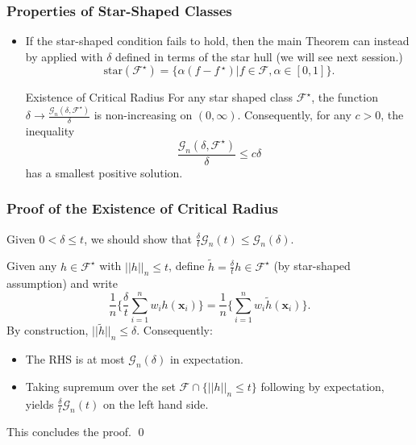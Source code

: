 \documentclass[11pt]{beamer}
\newcommand{\bx}{\mathbf{x}}
\newcommand{\cF}{\mathcal{F}}
\newcommand{\cG}{\mathcal{G}}
\newcommand{\fstar}{f\,^\star}
\begin{document}
	\begin{frame}
		\frametitle{Properties of Star-Shaped Classes}
		\begin{itemize}
			\item If the star-shaped condition fails to hold, then the main Theorem can instead by applied with $\delta$ defined in terms of the star hull (we will see next session.)
			\begin{equation*}
				\mathrm{star}(\cF^\star) = \big\{\alpha(f-\fstar) | f \in \cF, \alpha \in [0, 1]\big\}.
			\end{equation*}			
			
			\begin{block}{Existence of Critical Radius}
				For any star shaped class $\mathcal{F}^\star$, the function $\delta \rightarrow \frac{\cG_n(\delta, \cF^\star)}{\delta}$ is non-increasing on $(0, \infty)$. Consequently, for any $c>0$, the inequality 
				\begin{equation*}
			\frac{\cG_n(\delta, \cF^\star)}{\delta} \leq c\delta
			\end{equation*}
				has a smallest positive solution.
			\end{block}
		\end{itemize}			
	\end{frame}
		\begin{frame}
		\frametitle{Proof of the Existence of Critical Radius}
			Given $0< \delta \leq t$, we should show that $\frac{\delta}{t}\cG_n(t) \leq \cG_n(\delta)$. 
			
			Given any $h \in \cF^\star$ with $||h||_n\leq t$, define
			$\widetilde{h} = \frac{\delta}{t}h \in \cF^\star$ (by star-shaped assumption) and write
			\begin{equation*}
				\frac{1}{n}\Big\{\frac{\delta}{t} \sum_{i = 1}^{n} w_i h(\bx_i)\} = \frac{1}{n}\Big\{ \sum_{i = 1}^{n} w_i \widetilde{h}(\bx_i)\}.
			\end{equation*}
			By construction, $||\widetilde{h}||_n\leq \delta$. Consequently:
			
			\begin{itemize}
				\item  The RHS is at most $\cG_n(\delta)$ in expectation.
				\item Taking supremum  over the set $\cF \cap \{||h||_n\leq t\}$ following by expectation, yields $\frac{\delta}{t}\cG_n(t)$ on the left hand side. 
			\end{itemize}
		This concludes the proof. \qed
			 
		\end{frame}
	
\end{document}
